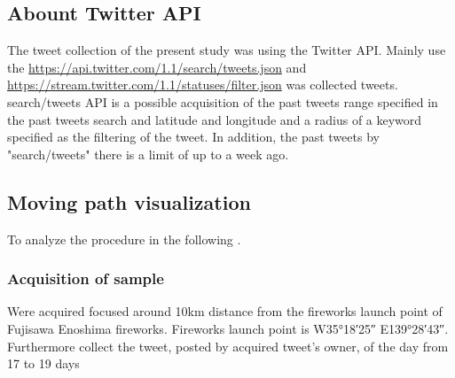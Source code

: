 \subsection{Abount Twitter API}
The tweet collection of the present study was using the Twitter API. Mainly use the \url{https://api.twitter.com/1.1/search/tweets.json} and \url{https://stream.twitter.com/1.1/statuses/filter.json} was collected tweets. search/tweets API is a possible acquisition of the past tweets range specified in the past tweets search and latitude and longitude and a radius of a keyword specified as the filtering of the tweet. In addition, the past tweets by "search/tweets" there is a limit of up to a week ago.

\subsection{Moving  path visualization}
To analyze the procedure in the following .

\subsubsection{Acquisition of sample}
Were acquired focused around 10km distance from the fireworks launch point of Fujisawa Enoshima fireworks. Fireworks launch point is W\ang{35;18;25} E\ang{139;28;43}. Furthermore collect the tweet, posted by acquired tweet's owner, of the day from 17 to 19 days


